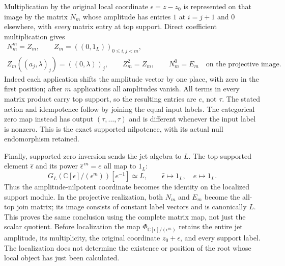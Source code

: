 Multiplication by the original local coordinate $\epsilon=z-z_0$
is represented on that image by the matrix $N_m$ whose amplitude
has entries $1$ at $i=j+1$ and $0$ elsewhere, with \emph{every}
matrix entry at top support. Direct coefficient multiplication
gives
\begin{equation}\tag{HZD17}
\begin{gathered}
 N_m^m=Z_m,\qquad
 Z_m=((0,1_L))_{0\le i,j<m},\\
 Z_m((a_j,\lambda)_j)=((0,\lambda))_j,\qquad
 Z_m^2=Z_m,\qquad N_m^0=E_m
 \quad\text{on the projective image}.
\end{gathered}
\end{equation}
Indeed each application shifts the amplitude vector by one place,
with zero in the first position; after $m$ applications all
amplitudes vanish. All terms in every matrix product carry top
support, so the resulting entries are $e$, not $\tau$.
The stated action and idempotence follow by joining the equal
input labels. The categorical zero map instead has output
$(\tau,\ldots,\tau)$ and is different whenever the input label
is nonzero. This is the exact supported nilpotence, with its
actual null endomorphism retained.

Finally, supported-zero inversion sends the jet algebra to $L$.
The top-supported element $\widehat\epsilon$ and its power
$\widehat\epsilon^{\,m}=e$ all map to $1_L$:
\begin{equation}\tag{HZD18}
 G_L(\mathbb C[\epsilon]/(\epsilon^m))[e^{-1}]
       \simeq L,\qquad
 \widehat\epsilon\longmapsto1_L,\quad e\longmapsto1_L.
\end{equation}
Thus the amplitude-nilpotent coordinate becomes the identity on
the localized support module. In the projective realization,
both $N_m$ and $E_m$ become the all-top join matrix; its image
consists of constant label vectors and is canonically $L$.
This proves the same conclusion using the complete matrix map,
not just the scalar quotient. Before localization the map
$\Phi_{\mathbb C[\epsilon]/(\epsilon^m)}$ retains the entire
jet amplitude, its multiplicity, the original coordinate
$z_0+\epsilon$, and every support label. The localization
does not determine the existence or position of the root whose
local object has just been calculated.
